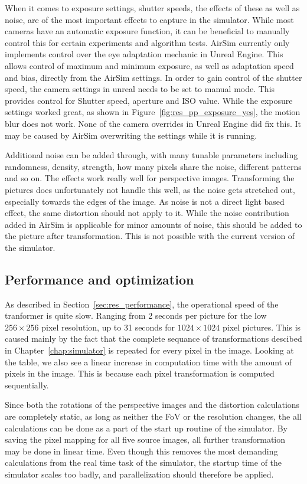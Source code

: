 When it comes to exposure settings, shutter speeds, the effects of these as well as noise, are of the most important effects to capture in the simulator. While most cameras have an automatic exposure function, it can be beneficial to manually control this for certain experiments and algorithm tests. AirSim currently only implements control over the eye adaptation mechanic in Unreal Engine. This allows control of maximum and minimum exposure, as well as adaptation speed and bias, directly from the AirSim settings. In order to gain control of the shutter speed, the camera settings in unreal needs to be set to manual mode. This provides control for Shutter speed, aperture and ISO value. While the exposure settings worked great, as shown in Figure~\ref{fig:res_pp_exposure_yes}, the motion blur does not work. None of the camera overrides in Unreal Engine did fix this. It may be caused by AirSim overwriting the settings while it is running.

Additional noise can be added through, with many tunable parameters including randomness, density, strength, how many pixels share the noise, different patterns and so on. The effects work really well for perspective images. Transforming the pictures does unfortunately not handle this well, as the noise gets stretched out, especially towards the edges of the image. As noise is not a direct light based effect, the same distortion should not apply to it. While the noise contribution added in AirSim is applicable for minor amounts of noise, this should be added to the picture after transformation. This is not possible with the current version of the simulator.

\subsection{Performance and optimization} \label{sec:disc_performance}

As described in Section~\ref{sec:res_performance}, the operational speed of the tranformer is quite slow. Ranging from 2 seconds per picture for the low $256\times 256$ pixel resolution, up to 31 seconds for $1024 \times 1024$ pixel pictures. This is caused mainly by the fact that the complete sequance of transformations descibed in Chapter~\ref{chap:simulator} is repeated for every pixel in the image. Looking at the table, we also see a linear increase in computation time with the amount of pixels in the image. This is because each pixel transformation is computed sequentially.

Since both the rotations of the perspective images and the distortion calculations are completely static, as long as neither the FoV or the resolution changes, the all calculations can be done as a part of the start up routine of the simulator. By saving the pixel mapping for all five source images, all further transformation may be done in linear time. Even though this removes the most demanding calculations from the real time task of the simulator, the startup time of the simulator scales too badly, and parallelization should therefore be applied.

